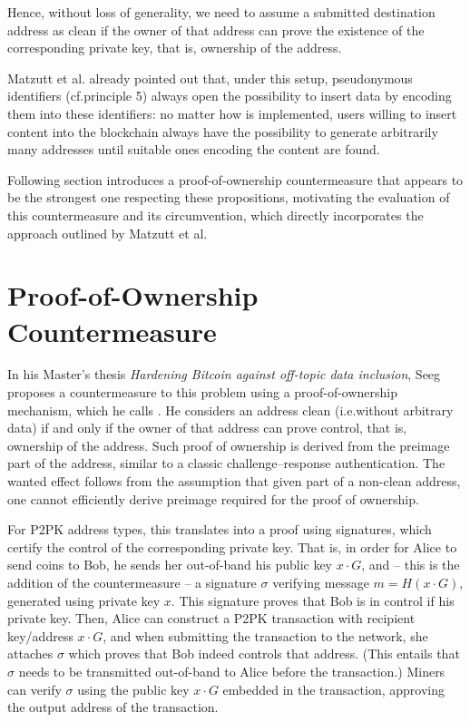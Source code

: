 \documentclass[a4paper,11pt,titlepage]{scrbook}
\begin{document}
Hence, without loss of generality, we need to assume a submitted destination address as clean if the owner of that address can prove the existence of the corresponding private key, that is, ownership of the address.

Matzutt et al.\@ \cite[Sec.~III.C]{matzutt_thwarting_2018} already pointed out that, under this setup, pseudonymous identifiers (cf.\@ principle 5) always open the possibility to insert data by encoding them into these identifiers: no matter how  is implemented, users willing to insert content into the blockchain always have the possibility to generate arbitrarily many addresses until suitable ones encoding the content are found.

Following section introduces a proof-of-ownership countermeasure that appears to be the strongest one respecting these propositions, motivating the evaluation of this countermeasure and its circumvention, which directly incorporates the approach outlined by Matzutt et al.


\section{Proof-of-Ownership Countermeasure}

In his Master's thesis \emph{Hardening Bitcoin against off-topic data inclusion}, Seeg proposes a countermeasure to this problem using a proof-of-ownership mechanism, which he calls  \cite{seeg_hardening_2018}.
He considers an address clean (i.e.\@ without arbitrary data) if and only if the owner of that address can prove control, that is, ownership of the address.
Such proof of ownership is derived from the  preimage part of the address, similar to a classic challenge–response authentication.
The wanted effect follows from the assumption that given  part of a non-clean address, one cannot efficiently derive  preimage required for the proof of ownership.

For P2PK address types, this translates into a proof using signatures, which certify the control of the corresponding private key.
That is, in order for Alice to send coins to Bob, he sends her out-of-band his public key $x\cdot G$, and – this is the addition of the countermeasure – a signature $\sigma$ verifying message $m=H(x\cdot G)$, generated using private key $x$.
This signature proves that Bob is in control if his private key.
Then, Alice can construct a P2PK transaction with recipient key/address $x\cdot G$, and when submitting the transaction to the network, she attaches $\sigma$ which proves that Bob indeed controls that address.
(This entails that $\sigma$ needs to be transmitted out-of-band to Alice before the transaction.)
Miners can verify $\sigma$ using the public key $x\cdot G$ embedded in the transaction, approving the output address of the transaction.
\end{document}
